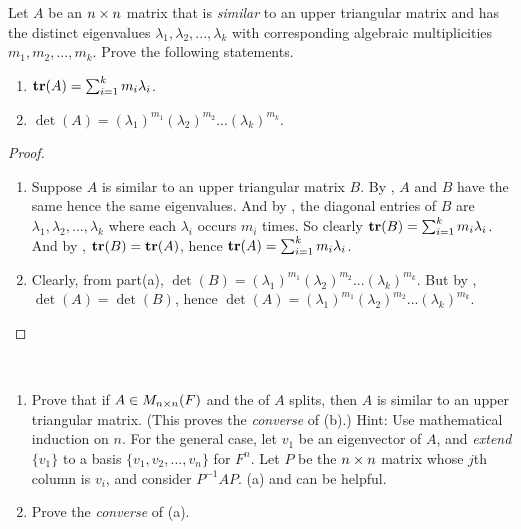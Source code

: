 \begin{exercise} \label{exercise 5.2.11}
Let \(A\) be an \(n \times n\) matrix that is \emph{similar} to an upper triangular matrix and has the distinct eigenvalues \(\lambda_1, \lambda_2, ..., \lambda_k\) with corresponding algebraic multiplicities \(m_1, m_2, ..., m_k\).
Prove the following statements.

\begin{enumerate}
\item \(\textbf{tr}(A) = \sum_{i = 1}^k m_i \lambda_i\).
\item \(\det(A) = (\lambda_1)^{m_1}(\lambda_2)^{m_2} ... (\lambda_k)^{m_k}\).
\end{enumerate}
\end{exercise}

\begin{proof} \ 

\begin{enumerate}
\item Suppose \(A\) is similar to an upper triangular matrix \(B\).
By , \(A\) and \(B\) have the same \CPOLY{} hence the same eigenvalues.
And by , the diagonal entries of \(B\) are \(\lambda_1, \lambda_2, ..., \lambda_k\) where each \(\lambda_i\) occurs \(m_i\) times.
So clearly \(\textbf{tr}(B) = \sum_{i = 1}^k m_i \lambda_i\).
And by , \(\textbf{tr}(B) = \textbf{tr}(A)\), hence \(\textbf{tr}(A) = \sum_{i = 1}^k m_i \lambda_i\).

\item 
Clearly, from part(a), \(\det(B) = (\lambda_1)^{m_1} (\lambda_2)^{m_2} ... (\lambda_k)^{m_k}\).
But by , \(\det(A) = \det(B)\), hence \(\det(A) = (\lambda_1)^{m_1} (\lambda_2)^{m_2} ... (\lambda_k)^{m_k}\).
\end{enumerate}
\end{proof}

\begin{exercise} \label{exercise 5.2.12} \ 

\begin{enumerate}
\item Prove that if \(A \in M_{n \times n}(F)\) and the \CPOLY{} of \(A\) splits, then \(A\) is similar to an upper triangular matrix.
(This proves the \emph{converse} of (b).)
Hint: Use mathematical induction on \(n\).
For the general case, let \(v_1\) be an eigenvector of \(A\), and \emph{extend} \(\{ v_1 \}\) to a basis \(\{ v_1, v_2, ..., v_n \}\) for \(F^n\).
Let \(P\) be the \(n \times n\) matrix whose \(j\)th column is \(v_i\), and consider \(P^{-1} A P\).
(a) and  can be helpful.

\item Prove the \emph{converse} of (a).
\end{enumerate}
\end{exercise}

